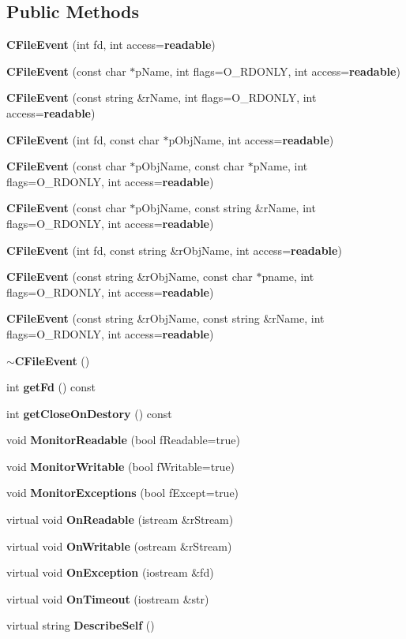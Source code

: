 \subsection*{Public Methods}
\begin{CompactItemize}
\item 
{\bf CFile\-Event} (int fd, int access={\bf readable})
\item 
{\bf CFile\-Event} (const char $\ast$p\-Name, int flags=O\_\-RDONLY, int access={\bf readable})
\item 
{\bf CFile\-Event} (const string \&r\-Name, int flags=O\_\-RDONLY, int access={\bf readable})
\item 
{\bf CFile\-Event} (int fd, const char $\ast$p\-Obj\-Name, int access={\bf readable})
\item 
{\bf CFile\-Event} (const char $\ast$p\-Obj\-Name, const char $\ast$p\-Name, int flags=O\_\-RDONLY, int access={\bf readable})
\item 
{\bf CFile\-Event} (const char $\ast$p\-Obj\-Name, const string \&r\-Name, int flags=O\_\-RDONLY, int access={\bf readable})
\item 
{\bf CFile\-Event} (int fd, const string \&r\-Obj\-Name, int access={\bf readable})
\item 
{\bf CFile\-Event} (const string \&r\-Obj\-Name, const char $\ast$pname, int flags=O\_\-RDONLY, int access={\bf readable})
\item 
{\bf CFile\-Event} (const string \&r\-Obj\-Name, const string \&r\-Name, int flags=O\_\-RDONLY, int access={\bf readable})
\item 
{\bf $\sim$CFile\-Event} ()
\item 
int {\bf get\-Fd} () const
\item 
int {\bf get\-Close\-On\-Destory} () const
\item 
void {\bf Monitor\-Readable} (bool f\-Readable=true)
\item 
void {\bf Monitor\-Writable} (bool f\-Writable=true)
\item 
void {\bf Monitor\-Exceptions} (bool f\-Except=true)
\item 
virtual void {\bf On\-Readable} (istream \&r\-Stream)
\item 
virtual void {\bf On\-Writable} (ostream \&r\-Stream)
\item 
virtual void {\bf On\-Exception} (iostream \&fd)
\item 
virtual void {\bf On\-Timeout} (iostream \&str)
\item 
virtual string {\bf Describe\-Self} ()
\end{CompactItemize}
